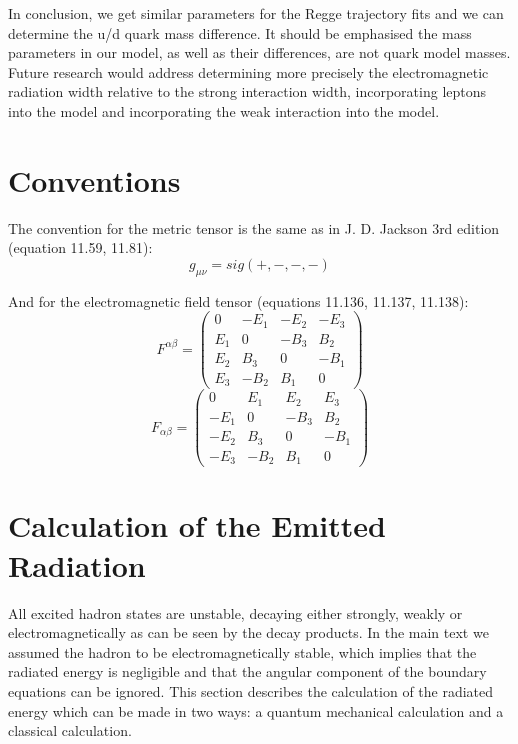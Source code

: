 \documentclass[11pt,a4paper]{article}
\begin{document}
In conclusion, we get similar parameters for the Regge trajectory fits and we can determine the u/d quark mass difference. It should be emphasised the mass parameters in our model, as well as their differences, are not quark model masses. Future research would address determining more precisely the electromagnetic radiation width relative to the strong interaction width, incorporating leptons into the model and incorporating the weak interaction into the model. 
\appendix
\FloatBarrier
\section{Conventions}
The convention for the metric tensor is the same as in J. D. Jackson 3rd edition (equation 11.59, 11.81):
\begin{equation*}
g_{\mu\nu}=sig(+,-,-,-)
\end{equation*}

And for the electromagnetic field tensor (equations 11.136, 11.137, 11.138):
\begin{equation*}
F^{\alpha\beta}=\left(\begin{array}{cccc}
0 & -E_{1} & -E_{2} & -E_{3}\\
E_{1} & 0 & -B_{3} & B_{2}\\
E_{2} & B_{3} & 0 & -B_{1}\\
E_{3} & -B_{2} & B_{1} & 0
\end{array}\right)
\end{equation*}
\begin{equation*}
F_{\alpha\beta}=\left(\begin{array}{cccc}
0 & E_{1} & E_{2} & E_{3}\\
-E_{1} & 0 & -B_{3} & B_{2}\\
-E_{2} & B_{3} & 0 & -B_{1}\\
-E_{3} & -B_{2} & B_{1} & 0
\end{array}\right)
\end{equation*}
\FloatBarrier

\section{Calculation of the Emitted Radiation}
\label{sec:radiation}

All excited hadron states are unstable, decaying either strongly, weakly or electromagnetically as can be seen by the decay products. In the main text we assumed the hadron to be electromagnetically stable, which implies that the radiated energy is negligible and that the angular component of the boundary equations can be ignored. This section describes the calculation of the radiated energy which can be made in two ways: a quantum mechanical calculation and a classical calculation.
\end{document}
